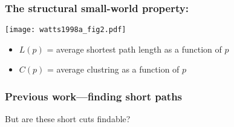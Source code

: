 
\begin{frame}
  \frametitle{The structural small-world property:}

  \begin{block}{}
    \texttt{[image: watts1998a\_fig2.pdf]}

    \small
    \begin{itemize}
    \item 
      $L(p)$ = average shortest path length as a function of $p$
    \item 
      $C(p)$ = average clustring as a function of $p$
    \end{itemize}
  \end{block}

\end{frame}



\begin{frame}
  \frametitle{Previous work---finding short paths}

  \begin{block}{}
  But are these short cuts findable?

  \bigskip


  \bigskip


  \bigskip

  \end{block}

\end{frame}

